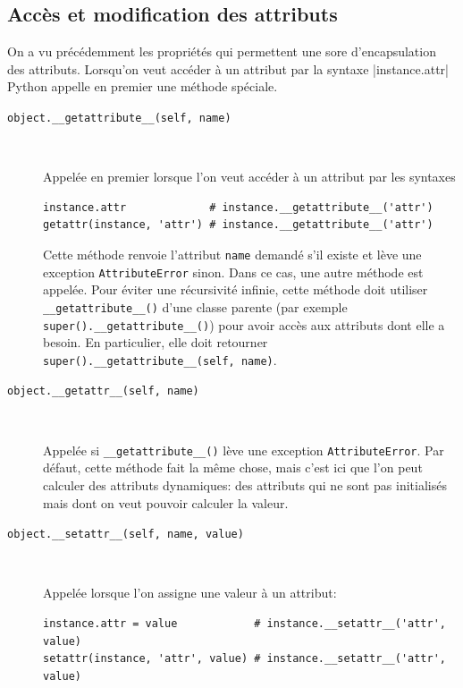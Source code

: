 \documentclass[a4paper, 10pt]{article}
\begin{document}
\subsection{Accès et modification des attributs}
On a vu précédemment les propriétés qui permettent une sore d'encapsulation des attributs. Lorsqu'on veut accéder à un attribut par la syntaxe |instance.attr| Python appelle en premier une méthode spéciale.

\begin{description}
    \item[\texttt{object.__getattribute__(self, name)}]~
    
    Appelée en premier lorsque l'on veut accéder à un attribut par les syntaxes
    \begin{verbatim}
instance.attr             # instance.__getattribute__('attr')
getattr(instance, 'attr') # instance.__getattribute__('attr')
    \end{verbatim} 
    Cette méthode renvoie l'attribut \texttt{name} demandé s'il existe et lève une exception \texttt{AttributeError} sinon. Dans ce cas, une autre méthode est appelée. Pour éviter une récursivité infinie, cette méthode doit utiliser \texttt{__getattribute__()} d'une classe parente (par exemple \texttt{super().__getattribute__()}) pour avoir accès aux attributs dont elle a besoin. En particulier, elle doit retourner \texttt{super().__getattribute__(self, name)}.

    \item[\texttt{object.__getattr__(self, name)}]~

    Appelée si \texttt{__getattribute__()} lève une exception \texttt{AttributeError}. Par défaut, cette méthode fait la même chose, mais c'est ici que l'on peut calculer des attributs dynamiques: des attributs qui ne sont pas initialisés mais dont on veut pouvoir calculer la valeur.

    \item[\texttt{object.__setattr__(self, name, value)}]~

Appelée lorsque l'on assigne une valeur à un attribut: 
    \begin{verbatim}
instance.attr = value            # instance.__setattr__('attr', value)
setattr(instance, 'attr', value) # instance.__setattr__('attr', value)
    \end{verbatim}
    

\end{description}
\end{document}
